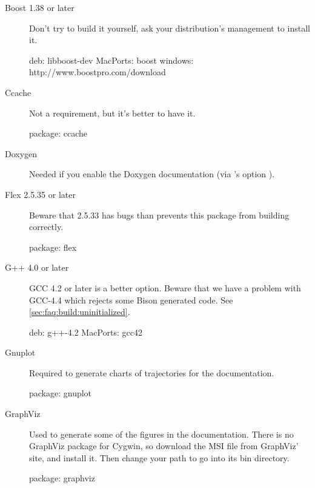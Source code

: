 \begin{description}
\item[Boost 1.38 or later] Don't try to build it yourself, ask your
  distribution's management to install it.
\begin{package}
deb: libboost-dev
MacPorts: boost
windows: http://www.boostpro.com/download
\end{package}

\item[Ccache]
  Not a requirement, but it's better to have it.
\begin{package}
package: ccache
\end{package}

\item[Doxygen] Needed if you enable the Doxygen documentation (via
  's option ).

\item[Flex 2.5.35 or later]
  Beware that 2.5.33 has bugs than prevents this package from building
  correctly.
\begin{package}
package: flex
\end{package}

\item[G++ 4.0 or later] GCC 4.2 or later is a better option.  Beware that we
  have a problem with GCC-4.4 which rejects some Bison generated code.  See
  \autoref{sec:faq:build:uninitialized}.
\begin{package}
deb: g++-4.2
MacPorts: gcc42
\end{package}

\item[Gnuplot]
  Required to generate charts of trajectories for the documentation.
\begin{package}
package: gnuplot
\end{package}

\item[GraphViz] Used to generate some of the figures in the
  documentation.  There is no GraphViz package for Cygwin, so download
  the MSI file from GraphViz' site, and install it.  Then change your
  path to go into its bin directory.


\begin{package}
package: graphviz
\end{package}


\end{description}
